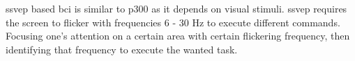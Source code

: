 \ac{ssvep} based \ac{bci} is similar to \ac{p300} as it depends on visual stimuli. \ac{ssvep} requires the screen to flicker with frequencies 6 - 30 Hz to execute different commands. Focusing one's attention on a certain area with certain flickering frequency, then identifying that frequency to execute the wanted task.
\clearpage
